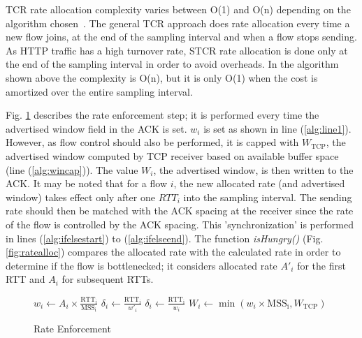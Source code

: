 \documentclass[conference]{../../IEEEtran}
\begin{document}
TCR rate allocation complexity varies between O(1) and O(n) depending on the algorithm chosen~\cite{references:karandikar}. The general TCR approach does rate allocation every time a new flow joins, at the end of the sampling interval and when a flow stops sending. As HTTP traffic has a high turnover rate, STCR rate allocation is done only at the end of the sampling interval in order to avoid overheads. In the algorithm shown above the complexity is O(n), but it is only O(1) when the cost is amortized over the entire sampling interval. 


\par Fig. \ref{fig:rateenf} describes the rate enforcement step; it is performed every time the advertised window field in the ACK is set. $w_i$ is set as shown in line (\ref{alg:line1}).  However, as flow control should also be performed, it is capped with $W_{\mathrm{TCP}}$, the advertised window computed by TCP receiver based on available buffer space (line (\ref{alg:wincap})). The value $W_i$, the advertised window, is then written to the ACK. It may be noted that for a flow $i$, the new allocated rate (and advertised window) takes effect only after one $RTT_i$ into the sampling interval. The sending rate should then be matched with the ACK spacing at the receiver since the rate of the flow is controlled by the ACK spacing. This 'synchronization' is performed in lines (\ref{alg:ifelsestart}) to (\ref{alg:ifelseend}). The function \emph{isHungry()} (Fig. \ref{fig:ratealloc}) compares the allocated rate with the calculated rate in order to determine if the flow is bottlenecked; it considers allocated rate $A'_i$ for the first RTT and $A_i$ for subsequent RTTs.

\begin{figure}[hbt]
\centering
\begin{algorithmic}[1]
	\STATE $w_i \leftarrow A_i \times \frac{\mathrm{RTT_i}}{\mathrm{MSS_i}}$ \label{alg:line1}
	 \label{alg:ifelsestart}
		\STATE $\delta_{i} \leftarrow \frac{\mathrm{RTT_i}}{w'_i}$
	\ELSE
		\STATE $\delta_{i} \leftarrow \frac{\mathrm{RTT_i}}{w_i}$	
	\ENDIF \label{alg:ifelseend}
	\STATE $W_i \leftarrow \min(w_i \times \mathrm{MSS_{i}}, W_{\mathrm{TCP}})$ \label{alg:wincap}
\end{algorithmic}
\caption{Rate Enforcement}
\label{fig:rateenf}
\end{figure}
\end{document}
